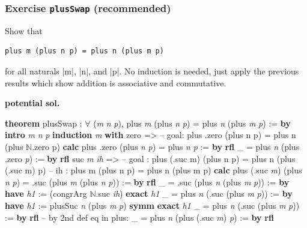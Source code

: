 \documentclass{memoir}
\newcommand{\PLFANat}{\ensuremath{\mathbb{N}}}
\newcommand{\PLFAForall}{\ensuremath{\forall}}
\newcommand{\PLFAComment}[1]{\textcolor{codecomment}{#1}}
\begin{document}
\par

\subsubsection{Exercise \texttt{plusSwap} (recommended)}\label{PLFA--in--Lean----Part--1----Induction-005F-005F-005F--Proof--by--Induction----Second--proof-005F-005F-005F--commutativity----Exercise----plusSwap-----005FLPAR-005Frecommended-005FRPAR-005F}

\par
\par\noindent Show that\begin{verbatim}
plus m (plus n p) = plus n (plus m p)
\end{verbatim}
for all naturals \LeanVerb|m|, \LeanVerb|n|, and \LeanVerb|p|. No induction is needed, just apply the
previous results which show addition is associative and commutative.

\par
\par\noindent \textbf{potential sol.}\begin{LeanVerbatim}
\textbf{theorem} plusSwap : \PLFAForall{} (\textit{m} \textit{n} \textit{p}), plus \textit{m} (plus \textit{n} \textit{p}) = plus \textit{n} (plus \textit{m} \textit{p}) := \textbf{by}
    \textbf{intro} \textit{m} \textit{n} \textit{p}
    \textbf{induction} \textit{m} \textbf{with}
     zero =>
      \PLFAComment{-- goal: plus .zero (plus n p) = plus n (plus \PLFANat{}.zero p)}
      \textbf{calc}
        plus .zero (plus \textit{n} \textit{p})
        = plus \textit{n} \textit{p}              := \textbf{by} \textbf{rfl}
      _ = plus \textit{n} (plus .zero \textit{p}) := \textbf{by} \textbf{rfl}
     suc \textit{m} \textit{ih} =>
        \PLFAComment{-- goal : plus (.suc m) (plus n p) = plus n (plus (.suc m) p)}
        \PLFAComment{-- ih   : plus m (plus n p) = plus n (plus m p)}
        \textbf{calc}
            plus (.suc \textit{m}) (plus \textit{n} \textit{p})
            = .suc (plus \textit{m} (plus \textit{n} \textit{p})) := \textbf{by} \textbf{rfl}
          _ = .suc (plus \textit{n} (plus \textit{m} \textit{p})) := \textbf{by}
            \textbf{have} \textit{h1} := (congrArg \PLFANat{}.suc \textit{ih})
            \textbf{exact} \textit{h1}
          _ = plus \textit{n} (.suc (plus \textit{m} \textit{p})) := \textbf{by}
            \textbf{have} \textit{h1} := plusSuc \textit{n} (plus \textit{m} \textit{p})
            \textbf{symm}
            \textbf{exact} \textit{h1}
          _ = plus \textit{n} (.suc (plus \textit{m} \textit{p})) := \textbf{by} \textbf{rfl}
          \PLFAComment{-- by 2nd def eq in plus:}
          _ = plus \textit{n} (plus (.suc \textit{m}) \textit{p}) := \textbf{by} \textbf{rfl}
\end{LeanVerbatim}

\par
\end{document}

